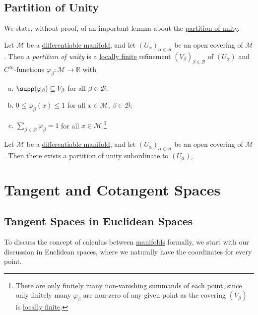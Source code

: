 \subsection{Partition of Unity}
We state, without proof, of an important lemma about the \hyperref[def:partition-of-unity]{partition of unity}.

\begin{definition}\label{def:partition-of-unity}
	Let \(\mathcal{M} \) be a \hyperref[def:smooth-manifold]{differentiable manifold}, and let \((U_\alpha )_{\alpha \in \mathcal{A} }\) be an open covering of \(\mathcal{M} \). Then a \emph{partition of unity} is a \hyperref[def:locally-finite]{locally finite} refinement \((V_\beta )_{\beta \in \mathcal{B} }\) of \((U_\alpha )\) and \(C^{\infty} \)-functions \(\varphi _\beta \colon \mathcal{M} \to \mathbb{R} \) with
	\begin{enumerate}[(a)]
		\item \(\supp(\varphi _\beta ) \subseteq V_\beta \) for all \(\beta \in \mathcal{B} \);
		\item \(0 \leq \varphi _\beta (x) \leq 1\) for all \(x\in \mathcal{M} \), \(\beta \in \mathcal{B} \);
		\item \(\sum_{\beta \in \mathcal{B} } \varphi _\beta = 1 \) for all \(x\in \mathcal{M} \).\footnote{There are only finitely many non-vanishing summands of each point, since only finitely many \(\varphi _\beta \) are non-zero of any given point as the covering \((V_\beta )\) is \hyperref[def:locally-finite]{locally finite}.}
	\end{enumerate}
\end{definition}

\begin{lemma}\label{lma:partition-of-unity}
	Let \(\mathcal{M} \) be a \hyperref[def:smooth-manifold]{differentiable manifold}, and let \((U_\alpha )_{\alpha \in \mathcal{A} }\) be an open covering of \(\mathcal{M} \). Then there exists a \hyperref[def:partition-of-unity]{partition of unity} subordinate to \((U_\alpha )\),
\end{lemma}

\section{Tangent and Cotangent Spaces}
\subsection{Tangent Spaces in Euclidean Spaces}
To discuss the concept of calculus between \hyperref[def:smooth-manifold]{manifolds} formally, we start with our discussion in Euclidean spaces, where we naturally have the coordinates for every point.

